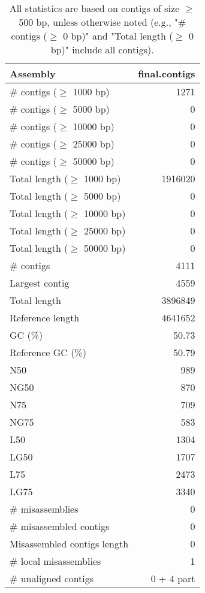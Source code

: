 \documentclass[12pt,a4paper]{article}
\begin{document}
\begin{table}[ht]
\begin{center}
\caption{All statistics are based on contigs of size $\geq$ 500 bp, unless otherwise noted (e.g., "\# contigs ($\geq$ 0 bp)" and "Total length ($\geq$ 0 bp)" include all contigs).}
\begin{tabular}{|l*{1}{|r}|}
\hline
Assembly & final.contigs \\ \hline
\# contigs ($\geq$ 1000 bp) & 1271 \\ \hline
\# contigs ($\geq$ 5000 bp) & 0 \\ \hline
\# contigs ($\geq$ 10000 bp) & 0 \\ \hline
\# contigs ($\geq$ 25000 bp) & 0 \\ \hline
\# contigs ($\geq$ 50000 bp) & 0 \\ \hline
Total length ($\geq$ 1000 bp) & 1916020 \\ \hline
Total length ($\geq$ 5000 bp) & 0 \\ \hline
Total length ($\geq$ 10000 bp) & 0 \\ \hline
Total length ($\geq$ 25000 bp) & 0 \\ \hline
Total length ($\geq$ 50000 bp) & 0 \\ \hline
\# contigs & 4111 \\ \hline
Largest contig & 4559 \\ \hline
Total length & 3896849 \\ \hline
Reference length & 4641652 \\ \hline
GC (\%) & 50.73 \\ \hline
Reference GC (\%) & 50.79 \\ \hline
N50 & 989 \\ \hline
NG50 & 870 \\ \hline
N75 & 709 \\ \hline
NG75 & 583 \\ \hline
L50 & 1304 \\ \hline
LG50 & 1707 \\ \hline
L75 & 2473 \\ \hline
LG75 & 3340 \\ \hline
\# misassemblies & 0 \\ \hline
\# misassembled contigs & 0 \\ \hline
Misassembled contigs length & 0 \\ \hline
\# local misassemblies & 1 \\ \hline
\# unaligned contigs & 0 + 4 part \\ \hline

\end{tabular}
\end{center}
\end{table}
\end{document}
